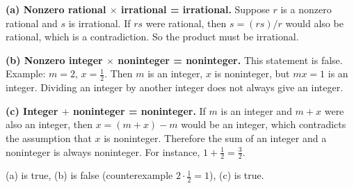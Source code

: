 \documentclass[11pt]{article}
\begin{document}
\noindent \textbf{(a) Nonzero rational $\times$ irrational = irrational.}  
Suppose $r$ is a nonzero rational and $s$ is irrational. If $rs$ were rational, then $s=(rs)/r$ would also be rational, which is a contradiction. So the product must be irrational.

\medskip
\noindent \textbf{(b) Nonzero integer $\times$ noninteger = noninteger.}  
This statement is false. Example: $m=2$, $x=\tfrac{1}{2}$. Then $m$ is an integer, $x$ is noninteger, but $mx = 1$ is an integer. Dividing an integer by another integer does not always give an integer.

\medskip
\noindent \textbf{(c) Integer $+$ noninteger = noninteger.}  
If $m$ is an integer and $m+x$ were also an integer, then $x=(m+x)-m$ would be an integer, which contradicts the assumption that $x$ is noninteger. Therefore the sum of an integer and a noninteger is always noninteger. For instance, $1+ \tfrac{1}{2} = \tfrac{3}{2}$.

\bigskip
  
(a) is true,  
(b) is false (counterexample $2 \cdot \tfrac{1}{2} = 1$), 
(c) is true.  
\end{document}
